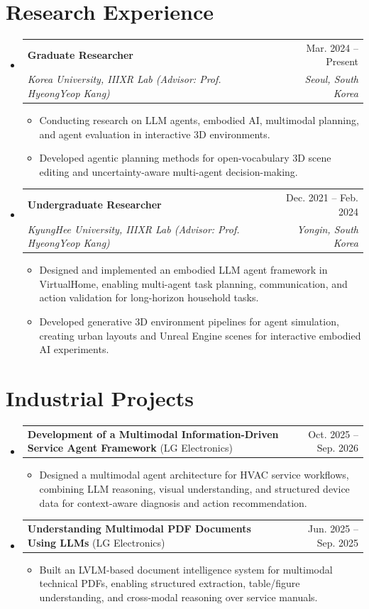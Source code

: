 \documentclass[letterpaper,10pt]{article}
\makeatletter
\newcommand{\resumeItem}[1]{
  \item\small{
    {#1}
  }
}
\newcommand{\resumeSubheading}[4]{
  \item
    \begin{tabular*}{0.97\textwidth}[t]{l@{\extracolsep{\fill}}r}
      \textbf{#1} & #2 \\
      \textit{\small#3} & \textit{\small #4} \\
    \end{tabular*}
}
\newcommand{\resumeProjectHeading}[2]{
    \item
    \begin{tabular*}{0.97\textwidth}[t]{l@{\extracolsep{\fill}}r}
      \small#1 & #2 \\
    \end{tabular*}
}
\newcommand{\resumeSubHeadingListStart}{\begin{itemize}[leftmargin=0.15in, label={}]}
\newcommand{\resumeSubHeadingListEnd}{\end{itemize}}
\newcommand{\resumeItemListStart}{\begin{itemize}}
\newcommand{\resumeItemListEnd}{\end{itemize}}
\makeatother
\begin{document}
\section{Research Experience}
  \resumeSubHeadingListStart
    \resumeSubheading
      {Graduate Researcher}{Mar. 2024 -- Present}
      {Korea University, IIIXR Lab (Advisor: Prof. HyeongYeop Kang)}{Seoul, South Korea}
      \resumeItemListStart
        \resumeItem{Conducting research on LLM agents, embodied AI, multimodal planning, and agent evaluation in interactive 3D environments.}
        \resumeItem{Developed agentic planning methods for open-vocabulary 3D scene editing and uncertainty-aware multi-agent decision-making.}
      \resumeItemListEnd
    \resumeSubheading
      {Undergraduate Researcher}{Dec. 2021 -- Feb. 2024}
      {KyungHee University, IIIXR Lab (Advisor: Prof. HyeongYeop Kang)}{Yongin, South Korea}
      \resumeItemListStart
        \resumeItem{Designed and implemented an embodied LLM agent framework in VirtualHome, enabling multi-agent task planning, communication, and action validation for long-horizon household tasks.}
        \resumeItem{Developed generative 3D environment pipelines for agent simulation, creating urban layouts and Unreal Engine scenes for interactive embodied AI experiments.}
      \resumeItemListEnd
  \resumeSubHeadingListEnd


\section{Industrial Projects}
  \resumeSubHeadingListStart
    \resumeProjectHeading
      {\textbf{Development of a Multimodal Information-Driven Service Agent Framework} (LG Electronics)}{Oct. 2025 -- Sep. 2026}
      \resumeItemListStart
        \resumeItem{Designed a multimodal agent architecture for HVAC service workflows, combining LLM reasoning, visual understanding, and structured device data for context-aware diagnosis and action recommendation.}
      \resumeItemListEnd
    \resumeProjectHeading
      {\textbf{Understanding Multimodal PDF Documents Using LLMs} (LG Electronics)}{Jun. 2025 -- Sep. 2025}
      \resumeItemListStart
        \resumeItem{Built an LVLM-based document intelligence system for multimodal technical PDFs, enabling structured extraction, table/figure understanding, and cross-modal reasoning over service manuals.}
      \resumeItemListEnd
  \resumeSubHeadingListEnd


\end{document}
